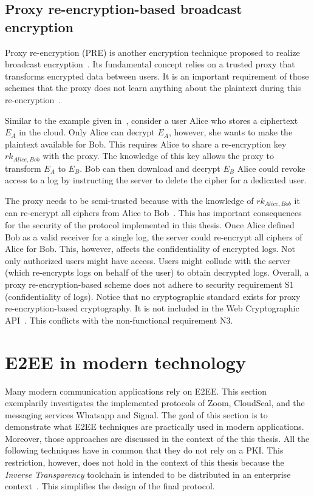 \documentclass[../main.tex]{subfiles}
\begin{document}
\subsection{Proxy re-encryption-based broadcast encryption}
\label{sec:broadcast-proxy}
Proxy re-encryption (PRE) is another encryption technique proposed to realize broadcast encryption~\cite{Hagg2022}.
Its fundamental concept relies on a trusted proxy that transforms encrypted data between users.
It is an important requirement of those schemes that the proxy does not learn anything about the plaintext during this re-encryption~\cite{Chen2018}.

Similar to the example given in~\cite{Hagg2022}, consider a user Alice who stores a ciphertext $E_A$ in the cloud.
Only Alice can decrypt $E_A$, however, she wants to make the plaintext available for Bob.
This requires Alice to share a re-encryption key $rk_{Alice,Bob}$ with the proxy.
The knowledge of this key allows the proxy to transform $E_A$ to $E_B$.
Bob can then download and decrypt $E_B$
Alice could revoke access to a log by instructing the server to delete the cipher for a dedicated user.

The proxy needs to be semi-trusted because with the knowledge of $rk_{Alice,Bob}$ it can re-encrypt all ciphers from Alice to Bob~\cite{Chen2018}.
This has important consequences for the security of the protocol implemented in this thesis.
Once Alice defined Bob as a valid receiver for a single log, the server could re-encrypt all ciphers of Alice for Bob.
This, however, affects the confidentiality of encrypted logs.
Not only authorized users might have access.
Users might collude with the server (which re-encrypts logs on behalf of the user) to obtain decrypted logs.
Overall, a proxy re-encryption-based scheme does not adhere to security requirement S1 (confidentiality of logs).
Notice that no cryptographic standard exists for proxy re-encryption-based cryptography.
It is not included in the Web Cryptographic API~\cite{WebCryptoApi2017}.
This conflicts with the non-functional requirement N3.

\section{E2EE in modern technology}
\label{sec:modern-e2ee}

Many modern communication applications rely on E2EE. 
This section exemplarily investigates the implemented protocols of Zoom, CloudSeal, and the messaging services Whatsapp and Signal.
The goal of this section is to demonstrate what E2EE techniques are practically used in modern applications.
Moreover, those approaches are discussed in the context of the this thesis.
All the following techniques have in common that they do not rely on a PKI.
This restriction, however, does not hold in the context of this thesis because the \emph{Inverse Transparency} toolchain is intended to be distributed in an enterprise context~\cite{Zieglmeier2021}.
This simplifies the design of the final protocol.
\end{document}
